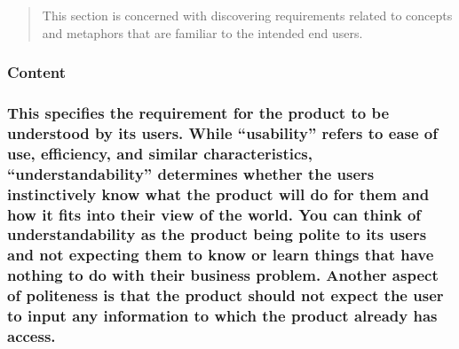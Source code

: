 \documentclass[
]{article}
\begin{document}
\begin{quote}
This section is concerned with discovering requirements related to
concepts and metaphors that are familiar to the intended end users.
\end{quote}

\hypertarget{content-35}{%
\subsubsection{Content}\label{content-35}}

\hypertarget{this-specifies-the-requirement-for-the-product-to-be-understood-by-its-users.-while-usability-refers-to-ease-of-use-efficiency-and-similar-characteristics-understandability-determines-whether-the-users-instinctively-know-what-the-product-will-do-for-them-and-how-it-fits-into-their-view-of-the-world.-you-can-think-of-understandability-as-the-product-being-polite-to-its-users-and-not-expecting-them-to-know-or-learn-things-that-have-nothing-to-do-with-their-business-problem.-another-aspect-of-politeness-is-that-the-product-should-not-expect-the-user-to-input-any-information-to-which-the-product-already-has-access.}{%
\subsubsection{This specifies the requirement for the product to be
understood by its users. While ``usability'' refers to ease of use,
efficiency, and similar characteristics, ``understandability''
determines whether the users instinctively know what the product will do
for them and how it fits into their view of the world. You can think of
understandability as the product being polite to its users and not
expecting them to know or learn things that have nothing to do with
their business problem. Another aspect of politeness is that the product
should not expect the user to input any information to which the product
already has
access.}\label{this-specifies-the-requirement-for-the-product-to-be-understood-by-its-users.-while-usability-refers-to-ease-of-use-efficiency-and-similar-characteristics-understandability-determines-whether-the-users-instinctively-know-what-the-product-will-do-for-them-and-how-it-fits-into-their-view-of-the-world.-you-can-think-of-understandability-as-the-product-being-polite-to-its-users-and-not-expecting-them-to-know-or-learn-things-that-have-nothing-to-do-with-their-business-problem.-another-aspect-of-politeness-is-that-the-product-should-not-expect-the-user-to-input-any-information-to-which-the-product-already-has-access.}}
\end{document}
